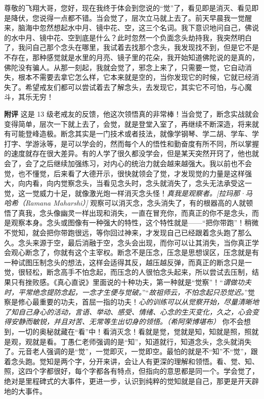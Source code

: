 \begin{case}
    尊敬的飞翔大哥，您好，现在我终于体会到您说的“觉”了，看见即是消灭、看见即是降伏，您说得一点都不错。当会觉了，层次立马就上去了。前天早晨我一觉醒来，脑海中忽然想起水中月、镜中花、空，这三个名词。我下意识地问自己，佛说的水中月、镜中花、空到底是什么？此时忽然一个负面念头劫持我，我突然明白了，我问自己那个念头在哪里，我试着去找那个念头，我发现找不到，但是它不是不存在，那种感觉就是水里的月亮、镜子里的花朵，我开始知道佛陀说的是真的，佛陀没有骗人。从那一刻起，我就会觉了，邪念上来了，只需要一觉，它自动消失，根本不需要去拿它怎么样，它本来就是空的，当你发现它的时候，它就已经消失了。希望戒友们都可以尝试着去了解念头，去发现它，其实它不可怕，与心魔斗，其乐无穷！

    \textbf{附评} 这是 13 级老戒友的反馈，他这次领悟真的非常棒！当会觉了，断念实战就会变得简单，层次一下就上去了，会觉，就是登堂入室了，再继续不断深造，将来就有可能登峰造极。断念其实是一门技术或者技法，就像学钢琴、学二胡、学车、学打字、学游泳等，是可以学会的，然而每个人的悟性和勤奋度有所不同，所以掌握的速度就存在很大差异。有的人学了很久都没学会，但是某天突然开窍了，他也就会了，会了之后继续加强练习，对内心的统治力就会越来越强大。我以前也不会觉，也不懂觉，后来看了大德开示，很快就领会了觉，才发现觉的力量是这样强大，向内看，向内觉察念头，当看见念头时，念头就消失了，念头无法承受这一觉，这一觉威力十足，就像激光炮一样消灭念头怪！\textit{真我是观察者。[拉玛那·马哈希（Ramana Maharshi）]} 观察可以消灭念，念头消失了，有的根器高的人就顿悟了真我，念头像幽灵一样出现和消失，一直在冒充你，而真正的你不是念头，而是观察本身。念头或图像有一种强大的特性，这个特性就是——“把你带跑”！稍微不觉知，就会把你带跑很远，等你回过神来，才发现自己已经跟着念头跑了那么久。念头来源于空，最后消融于空，念头会出现，而你可以让其消失，当你真正学会观心断念了，你就有这个主宰权。断念不是压念，压念是思想误区，压念就是有一种试图压制念头的想法，这样会适得其反，越压越反弹，而真正的断念只是一觉，很轻松，断念高手不怕念起，而压念的人很怕念头起来，所以尝试去压制，结果只有挫败感。《真心直说》里面说的十种功夫，第一种就是“觉察”！“\textit{谓做功夫时，平常绝念提防念起，一念才生便与觉破。}”“\textit{故祖师云，不怕念起只恐觉迟。}”觉察是修心最重要的功夫，首屈一指的功夫！\textit{心的训练可以从觉察开始，尽量清晰地了知自己身心的活动，言语、举动、感受、情绪、心念的生灭变化，久之，心会变得安静而敏锐，并且对苦、无常等生出切身的领悟。（希阿荣博堪布）} 你不会想到，一切的奥秘就藏在“看”中！看消灭念！看就是觉，觉就是知，知就是照，照就是观，观就是看。丁愚仁老师强调的是“知”，知道就行，知道念头，念头就消失了。元音老人强调的是“觉”，一觉即灭，一觉即空。最怕的就是不“知”不“觉”，跟着念头跑。觉知是两个字，分开来讲，会让人有更深的理解和领悟。看、觉、知、照，这四个字都很好，每个字都各有特点，但指向的意思都是同一个。学会觉了，绝对是里程碑式的大事件，更进一步，认识到纯粹的觉知就是自己，那更是开天辟地的大事件。
\end{case}

